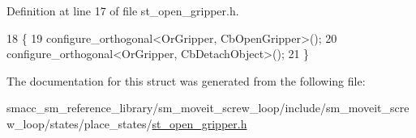 Definition at line 17 of file st\+\_\+open\+\_\+gripper.\+h.


\begin{DoxyCode}
18             \{
19                 configure\_orthogonal<OrGripper, CbOpenGripper>();
20                 configure\_orthogonal<OrGripper, CbDetachObject>();
21             \}
\end{DoxyCode}


The documentation for this struct was generated from the following file\+:\begin{DoxyCompactItemize}
\item 
smacc\+\_\+sm\+\_\+reference\+\_\+library/sm\+\_\+moveit\+\_\+screw\+\_\+loop/include/sm\+\_\+moveit\+\_\+screw\+\_\+loop/states/place\+\_\+states/\hyperlink{sm__moveit__screw__loop_2include_2sm__moveit__screw__loop_2states_2place__states_2st__open__gripper_8h}{st\+\_\+open\+\_\+gripper.\+h}\end{DoxyCompactItemize}
